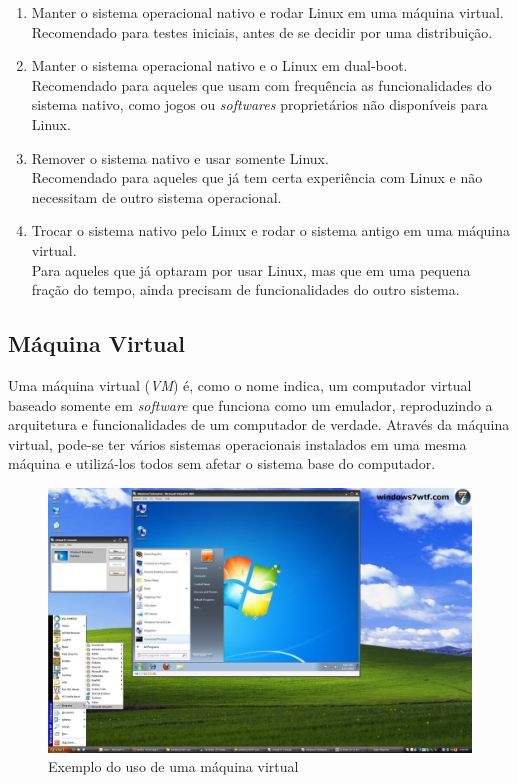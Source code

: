 \documentclass{handout_utfpr}
\begin{document}
\begin{enumerate}
\item Manter o sistema operacional nativo e rodar Linux em uma máquina virtual.\\
  Recomendado para testes iniciais, antes de se decidir por uma distribuição.

\item Manter o sistema operacional nativo e o Linux em dual-boot.\\
  Recomendado para aqueles que usam com frequência as funcionalidades do sistema nativo, como jogos ou \textit{softwares} proprietários não disponíveis para Linux.

\item Remover o sistema nativo e usar somente Linux.\\
  Recomendado para aqueles que já tem certa experiência com Linux e não necessitam de outro sistema operacional.

\item Trocar o sistema nativo pelo Linux e rodar o sistema antigo em uma máquina virtual.\\
  Para aqueles que já optaram por usar Linux, mas que em uma pequena fração do tempo, ainda precisam de funcionalidades do outro sistema.
\end{enumerate}

\subsection{Máquina Virtual}

Uma máquina virtual (\emph{VM}) é, como o nome indica, um computador virtual baseado somente em \emph{software} que funciona como um emulador, reproduzindo a arquitetura e funcionalidades de um computador de verdade. Através da máquina virtual, pode-se ter vários sistemas operacionais instalados em uma mesma máquina e utilizá-los todos sem afetar o sistema base do computador.

\begin{figure}[!h]
  \centering
  \includegraphics[scale=.3]{imagens/vm.jpg}
  \caption{Exemplo do uso de uma máquina virtual}
  \label{fig:vm}
\end{figure}
\end{document}
